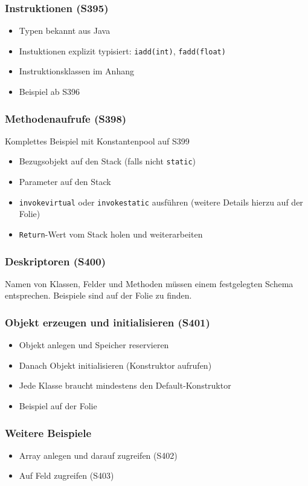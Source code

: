 \subsubsection{Instruktionen (S395)}
\begin{itemize}
	\item Typen bekannt aus Java
	\item Instuktionen explizit typisiert: \texttt{iadd(int)}, \texttt{fadd(float)}
	\item Instruktionsklassen im Anhang
	\item Beispiel ab S396
\end{itemize}

\subsubsection{Methodenaufrufe (S398)}
Komplettes Beispiel mit Konstantenpool auf S399
\begin{itemize}
	\item Bezugsobjekt auf den Stack (falls nicht \texttt{static})
	\item Parameter auf den Stack
	\item \texttt{invokevirtual} oder \texttt{invokestatic} ausführen (weitere Details hierzu auf der Folie)
	\item \texttt{Return}-Wert vom Stack holen und weiterarbeiten
\end{itemize}

\subsubsection{Deskriptoren (S400)}
Namen von Klassen, Felder und Methoden müssen einem festgelegten Schema entsprechen. Beispiele sind auf der Folie zu finden.

\subsubsection{Objekt erzeugen und initialisieren (S401)}
\begin{itemize}
	\item Objekt anlegen und Speicher reservieren
	\item Danach Objekt initialisieren (Konstruktor aufrufen)
	\item Jede Klasse braucht mindestens den Default-Konstruktor
	\item Beispiel auf der Folie
\end{itemize}

\subsubsection{Weitere Beispiele}
\begin{itemize}
	\item Array anlegen und darauf zugreifen (S402)
	\item Auf Feld zugreifen (S403)
\end{itemize}



